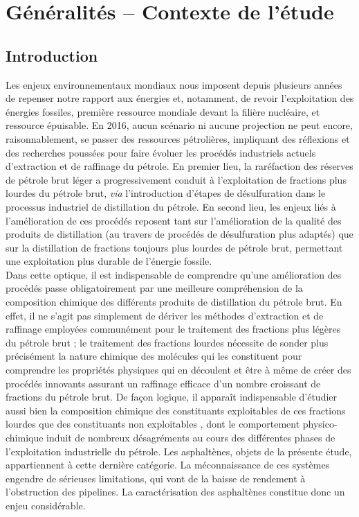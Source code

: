 \chapter{Généralités -- Contexte de l'étude}

\renewcommand{\chaptername}{Chapitre}

\minitoc
\restoregeometry

\newpage	
	\section*{Introduction}
	
Les enjeux environnementaux mondiaux nous imposent depuis plusieurs années de repenser notre rapport aux énergies et, notamment, de revoir l'exploitation des énergies fossiles, première ressource mondiale devant la filière nucléaire, et ressource épuisable. En 2016, aucun scénario ni aucune projection ne peut encore, raisonnablement, se passer des ressources pétrolières, impliquant des réflexions et des recherches poussées pour faire évoluer les procédés industriels actuels d'extraction et de raffinage du pétrole. En premier lieu, la raréfaction des réserves de pétrole brut léger a progressivement conduit à l'exploitation de fractions plus lourdes du pétrole brut, \textit{via} l'introduction d'étapes de désulfuration dans le processus industriel de distillation du pétrole. En second lieu, les enjeux liés à l'amélioration de ces procédés reposent tant sur l'amélioration de la qualité des produits de distillation (au travers de procédés de désulfuration plus adaptés) que sur la distillation de fractions toujours plus lourdes de pétrole brut, permettant une exploitation plus durable de l'énergie fossile.\\

Dans cette optique, il est indispensable de comprendre qu'une amélioration des procédés passe obligatoirement par une meilleure compréhension de la composition chimique des différents produits de distillation du pétrole brut. En effet, il ne s'agit pas simplement de dériver les méthodes d'extraction et de raffinage employées communément pour le traitement des fractions plus légères du pétrole brut ; le traitement des fractions lourdes nécessite de sonder plus précisément la nature chimique des molécules qui les constituent pour comprendre les propriétés physiques qui en découlent et être à même de créer des procédés innovants assurant un raffinage efficace d'un nombre croissant de fractions du pétrole brut. De façon logique, il apparaît indispensable d'étudier aussi bien la composition chimique des constituants \og exploitables\fg{} de ces fractions lourdes que des constituants \og non exploitables \fg, dont le comportement physico-chimique induit de nombreux désagréments au cours des différentes phases de l'exploitation industrielle du pétrole. Les asphaltènes, objets de la présente étude, appartiennent à cette dernière catégorie. La méconnaissance de ces systèmes engendre de sérieuses limitations, qui vont de la baisse de rendement à l'obstruction des pipelines. La caractérisation des asphaltènes constitue donc un enjeu considérable.\\ 

